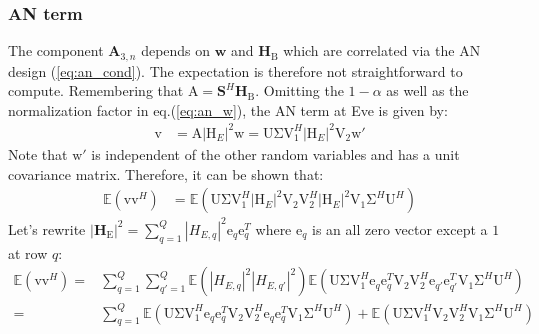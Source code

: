 \documentclass[12pt, draftclsnofoot, onecolumn]{IEEEtran}
\newcommand{\HE}{\textbf{H}_{\text{E}}}
\newcommand{\HB}{\textbf{H}_{\text{B}}}
\newcommand{\spread}{\textbf{S}}
\newcommand{\vect}[1]{\boldsymbol{\mathrm{#1}}}
\newcommand{\mat}[1]{\boldsymbol{\mathrm{#1}}}
\begin{document}
\subsubsection{AN term}\label{sec:an-term-app-2}
The component $\textbf{A}_{3,n}$ depends on $\textbf{w}$ and $\HB$ which are correlated via the AN design (\ref{eq:an_cond}). The expectation is therefore not straightforward to compute. Remembering that $\mat{A} = \spread^H \HB$. Omitting the $1-\alpha$ as well as the normalization  factor in eq.(\ref{eq:an_w}), the AN term at Eve is given by:
\begin{equation}
	\begin{split}
	\vect{v}&=\mat{A} |\mat{H}_E|^2 \vect{w} \label{eq:an_decod1_a} =\mat{U} \mat{\Sigma}\mat{V}_1^H |\mat{H}_E|^2 \mat{V}_2 \vect{w}'
	\end{split}
\end{equation}
Note that $\vect{w}'$ is independent of the other random variables and has a unit covariance matrix. Therefore, it can be shown that:
\begin{align}
\mathbb{E}\left(\vect{v}\vect{v}^H\right)&=\mathbb{E}\left(\mat{U} \mat{\Sigma}\mat{V}_1^H |\mat{H}_E|^2 \mat{V}_2 \mat{V}_2^H|\mat{H}_E|^2\mat{V}_1 \mat{\Sigma}^H   \mat{U}^H\right)
\end{align}
Let's rewrite $|\HE|^2=\sum_{q=1}^Q|H_{E,q}|^2 \vect{e}_q \vect{e}_q^T $ where $\vect{e}_q$ is an all zero vector except a $1$ at row $q$:
\begin{equation}
	\begin{split}
	\mathbb{E}\left(\vect{v}\vect{v}^H\right)=&\sum_{q=1}^Q\sum_{q'=1}^Q\mathbb{E}(|H_{E,q}|^2|H_{E,q'}|^2) \mathbb{E}\left(\mat{U} \mat{\Sigma}\mat{V}_1^H  \vect{e}_q \vect{e}_q^T \mat{V}_2 \mat{V}_2^H \vect{e}_{q'} \vect{e}_{q'}^T\mat{V}_1 \mat{\Sigma}^H   \mat{U}^H\right)\\
	=&\sum_{q=1}^Q\mathbb{E}\left(\mat{U} \mat{\Sigma}\mat{V}_1^H  \vect{e}_q \vect{e}_q^T \mat{V}_2 \mat{V}_2^H \vect{e}_{q} \vect{e}_{q}^T\mat{V}_1 \mat{\Sigma}^H   \mat{U}^H\right) +\mathbb{E}\left(\mat{U} \mat{\Sigma}\mat{V}_1^H  \mat{V}_2 \mat{V}_2^H \mat{V}_1 \mat{\Sigma}^H   \mat{U}^H\right)
	\end{split}
\end{equation}
\end{document}
